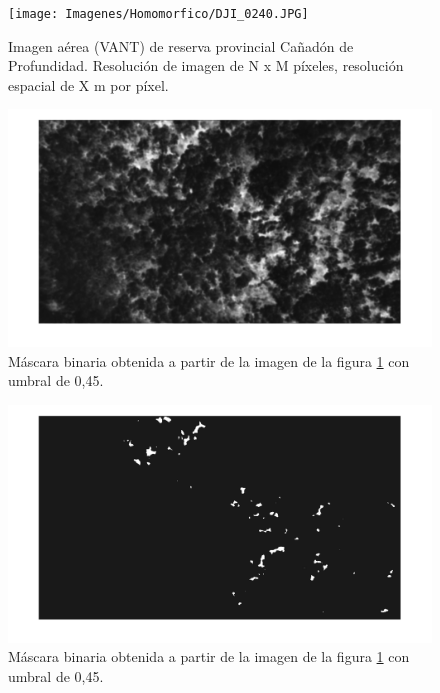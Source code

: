 \begin{figure}[h!]
    \texttt{[image: Imagenes/Homomorfico/DJI\_0240.JPG]}
     \hfill
     \caption{Imagen aérea (VANT) de reserva provincial Cañadón de Profundidad. Resolución de imagen de N x M píxeles, resolución espacial de X m por píxel.}
    \label{Cañadon_homo}
\end{figure}

\begin{figure}[h!]
    \includegraphics[width=\textwidth]{Imagenes/Homomorfico/dji_240_filter.png}
     \hfill
     \caption{Máscara binaria obtenida a partir de la imagen de la figura \ref{Cañadon_homo} con umbral de 0,45.}
    \label{Cañadon}
\end{figure}

\begin{figure}[h!]
    \includegraphics[width=\textwidth]{Imagenes/Homomorfico/DJI_240_bin.png}
     \hfill
     \caption{Máscara binaria obtenida a partir de la imagen de la figura \ref{Cañadon_homo} con umbral de 0,45.}
    \label{mascaraCañadon}
\end{figure}

